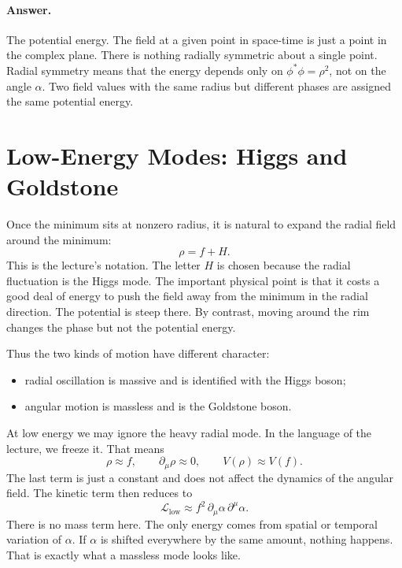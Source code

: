 \paragraph{Answer.} The potential energy. The field at a given point in space-time is just a point in the complex plane. There is nothing radially symmetric about a single point. Radial symmetry means that the energy depends only on \(\phi^*\phi=\rho^2\), not on the angle \(\alpha\). Two field values with the same radius but different phases are assigned the same potential energy.

\section{Low-Energy Modes: Higgs and Goldstone}

Once the minimum sits at nonzero radius, it is natural to expand the radial field around the minimum:
\begin{equation}
\rho = f + H.
\end{equation}
This is the lecture's notation. The letter \(H\) is chosen because the radial fluctuation is the Higgs mode. The important physical point is that it costs a good deal of energy to push the field away from the minimum in the radial direction. The potential is steep there. By contrast, moving around the rim changes the phase but not the potential energy.

Thus the two kinds of motion have different character:

\begin{itemize}
\item radial oscillation is massive and is identified with the Higgs boson;
\item angular motion is massless and is the Goldstone boson.
\end{itemize}

At low energy we may ignore the heavy radial mode. In the language of the lecture, we freeze it. That means
\begin{equation}
\rho \approx f,
\qquad
\partial_\mu \rho \approx 0,
\qquad
V(\rho)\approx V(f).
\end{equation}
The last term is just a constant and does not affect the dynamics of the angular field. The kinetic term then reduces to
\begin{equation}
\mathcal L_{\text{low}} \approx f^2 \,\partial_\mu\alpha\,\partial^\mu\alpha.
\end{equation}
There is no mass term here. The only energy comes from spatial or temporal variation of \(\alpha\). If \(\alpha\) is shifted everywhere by the same amount, nothing happens. That is exactly what a massless mode looks like.

